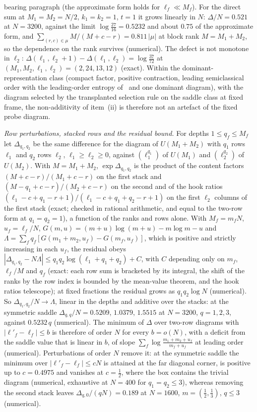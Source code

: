 bearing paragraph (the approximate form holds for \(\ell_f\ll M_f\)). For the direct sum at \(M_1=M_2=N/2\), \(k_1=k_2=1\), \(t=1\) it grows linearly in \(N\): \(\Delta/N=0.521\) at \(N=3200\), against the limit \(\log\frac{27}{16}=0.5232\) and about \(0.75\) of the approximate form, and \(\sum_{(r,c)\in\mu}M/(M+c-r)=0.811\,|\mu|\) at block rank \(M=M_1+M_2\), so the dependence on the rank survives (numerical). The defect is not monotone in \(\ell_2\): \(\Delta(\ell_1,\ell_2+1)-\Delta(\ell_1,\ell_2)=\log\frac{37}{72}\) at \((M_1,M_2,\ell_1,\ell_2)=(2,24,13,12)\) (exact). Within the dominant-representation class (compact factor, positive contraction, leading semiclassical order with the leading-order entropy of~\cite{FlissFrenkelHartnollSoni2025} and one dominant diagram), with the diagram selected by the transplanted selection rule on the saddle class at fixed frame, the non-additivity of item~(ii) is therefore not an artefact of the fixed probe diagram.

\emph{Row perturbations, stacked rows and the residual bound.} For depths \(1\le q_f\le M_f\) let \(\Delta_{q_1,q_2}\) be the same difference for the diagram of \(U(M_1+M_2)\) with \(q_1\) rows \(\ell_1\) and \(q_2\) rows \(\ell_2\), \(\ell_1\ge\ell_2\ge0\), against \((\ell_1^{q_1})\) of \(U(M_1)\) and \((\ell_2^{q_2})\) of \(U(M_2)\). With \(M=M_1+M_2\), \(\exp\Delta_{q_1,q_2}\) is the product of the content factors \((M+c-r)/(M_1+c-r)\) on the first stack and \((M-q_1+c-r)/(M_2+c-r)\) on the second and of the hook ratios \((\ell_1-c+q_1-r+1)/(\ell_1-c+q_1+q_2-r+1)\) on the first \(\ell_2\) columns of the first stack (exact; checked in rational arithmetic, and equal to the two-row form at \(q_1=q_2=1\)), a function of the ranks and rows alone. With \(M_f=m_fN\), \(u_f=\ell_f/N\), \(G(m,u)=(m+u)\log(m+u)-m\log m-u\) and \(\Lambda=\sum_fq_f[G(m_1+m_2,u_f)-G(m_f,u_f)]\), which is positive and strictly increasing in each \(u_f\), the residual obeys \(|\Delta_{q_1,q_2}-N\Lambda|\le q_1q_2\log(\ell_1+q_1+q_2)+C\), with \(C\) depending only on \(m_f\), \(\ell_f/M\) and \(q_f\) (exact: each row sum is bracketed by its integral, the shift of the ranks by the row index is bounded by the mean-value theorem, and the hook ratios telescope); at fixed fractions the residual grows as \(q_1q_2\log N\) (numerical). So \(\Delta_{q_1,q_2}/N\to\Lambda\), linear in the depths and additive over the stacks: at the symmetric saddle \(\Delta_{q,q}/N=0.5209\), \(1.0379\), \(1.5515\) at \(N=3200\), \(q=1,2,3\), against \(0.5232\,q\) (numerical). The minimum of \(\Delta\) over two-row diagrams with \(|\ell'_f-\ell_f|\le b\) is therefore of order \(N\) for every \(b=o(N)\), with a deficit from the saddle value that is linear in \(b\), of slope \(\sum_f\log\frac{m_1+m_2+u_f}{m_f+u_f}\) at leading order (numerical). Perturbations of order \(N\) remove it: at the symmetric saddle the minimum over \(|\ell'_f-\ell_f|\le cN\) is attained at the far diagonal corner, is positive up to \(c=0.4975\) and vanishes at \(c=\tfrac12\), where the box contains the trivial diagram (numerical, exhaustive at \(N=400\) for \(q_1=q_2\le3\)), whereas removing the second stack leaves \(\Delta_{q,0}/(qN)=0.189\) at \(N=1600\), \(m=(\tfrac12,\tfrac13)\), \(q\le3\) (numerical).

